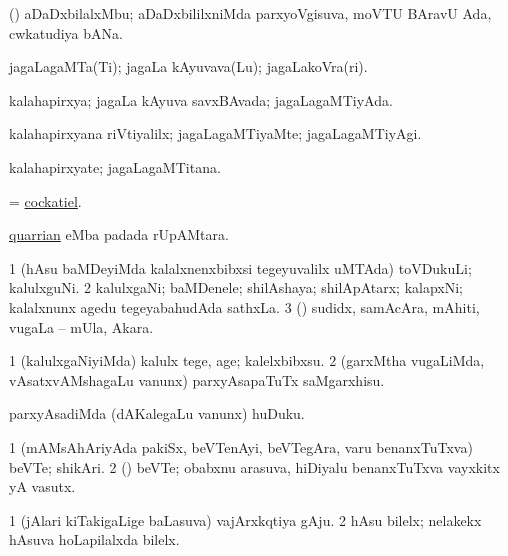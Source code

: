 \bentry
{}
\gl{\nA}
\bmng
(\ca) aDaDxbilalxMbu; aDaDxbililxniMda parxyoVgisuva, moVTU BAravU Ada, cwkatudiya bANa. 
\emng
\eentry

\bentry
{}
\gl{\nA}
\bmng
jagaLagaMTa(Ti); jagaLa kAyuvava(Lu); jagaLakoVra(ri). 
\emng
\eentry

\bentry
{}
\gl{\gu}
\bmng
kalahapirxya; jagaLa kAyuva savxBAvada; jagaLa\-gaMTiyAda. 
\emng
\eentry

\bentry
{}
\gl{\kirxvi}
\bmng
kalahapirxyana riVtiyalilx; jagaLagaMTiyaMte; jagaLagaMTiyAgi. 
\emng
\eentry

\bentry
{}
\gl{\nA}
\bmng
kalahapirxyate; jagaLagaMTitana. 
\emng
\eentry

\bentry
{}
\gl{\nA}
\bmng
= \hyperref{kandict_c.pdf}{C}{cockatiel}{cockatiel}. 
\emng
\eentry

\bentry
{}
\gl{\nA}
\bmng
\hyperlink{quarrian}{quarrian} eMba padada rUpAMtara. 
\emng
\eentry

\bentry
{}
\gl{\nA}
\bmng
\bnum
\num{1} (hAsu baMDeyiMda kalalxnenxbibxsi tegeyuvalilx uMTAda) toVDukuLi; kalulxguNi. 
\num{2} kalulxgaNi; baMDenele; shilAshaya; shilApAtarx; kalapxNi; kalalxnunx agedu tegeyabahudAda sathxLa. 
\num{3} (\rUpa) sudidx, samAcAra, mAhiti, \mo vugaLa -- mUla, Akara. 
\enum
\emng
\eentry

\bentry
{}
\gl{\sakirx}
\bmng
\bnum
\num{1} (kalulxgaNiyiMda) kalulx tege, age; kalelxbibxsu. 
\num{2} (garxMtha \mo vugaLiMda, vAsatxvAMshagaLu \mo vanunx) parxyAsapaTuTx saMgarxhisu. 
\enum
\emng

\noindent
\gl{\akirx}
\bmng
parxyAsadiMda (dAKalegaLu \mo vanunx) huDuku. 
\emng
\eentry

\bentry
{}
\gl{\nA}
\bmng
\bnum
\num{1} (mAMsAhAriyAda pakiSx, beVTenAyi, beVTegAra, \mo varu benanxTuTxva) beVTe; shikAri. 
\num{2} (\rUpa) beVTe; obabxnu arasuva, hiDiyalu benanxTuTxva vayxkitx yA vasutx. 
\enum
\emng
\eentry

\bentry
{}
\gl{\nA}
\bmng
\bnum
\num{1} (jAlari kiTakigaLige baLasuva) vajArxkqtiya gAju. 
\hypertarget{quarry(4)2}{} 
\num{2} hAsu bilelx; nelakekx hAsuva hoLapilalxda bilelx. 
\enum
\emng

